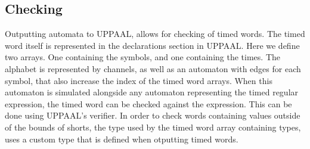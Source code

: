 \subsection{Checking}\label{subsec:checking}

Outputting automata to UPPAAL, allows for checking of timed words. The timed word itself is represented in the declarations section in UPPAAL.
Here we define two arrays. One containing the symbols, and one containing the times. 
The alphabet is represented by channels, as well as an automaton with edges for each symbol, that also increase the index of the timed word arrays.
When this automaton is simulated alongside any automaton representing the timed regular expression, the timed word can be checked against the expression.
This can be done using UPPAAL's verifier.
In order to check words containing values outside of the bounds of shorts, the type used by the timed word array containing types, uses a custom type that is defined when otputting timed words.
